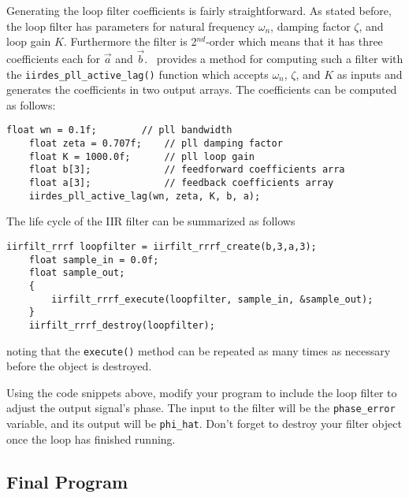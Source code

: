 Generating the loop filter coefficients is fairly straightforward.
As stated before, the loop filter has parameters for
natural frequency $\omega_n$,
damping factor $\zeta$, and
loop gain $K$.
Furthermore the filter is 2$^{nd}$-order which means that it has three
coefficients each for $\vec{a}$ and $\vec{b}$.
\liquid\ provides a method for computing such a filter with the
{\tt iirdes\_pll\_active\_lag()} function
which accepts $\omega_n$, $\zeta$, and $K$ as inputs and generates the
coefficients in two output arrays.
The coefficients can be computed as follows:
%
\begin{Verbatim}[fontsize=\small]
    float wn = 0.1f;        // pll bandwidth
    float zeta = 0.707f;    // pll damping factor
    float K = 1000.0f;      // pll loop gain
    float b[3];             // feedforward coefficients arra
    float a[3];             // feedback coefficients array
    iirdes_pll_active_lag(wn, zeta, K, b, a);
\end{Verbatim}
%
The life cycle of the IIR filter can be summarized as follows
%
\begin{Verbatim}[fontsize=\small]
    iirfilt_rrrf loopfilter = iirfilt_rrrf_create(b,3,a,3);
    float sample_in = 0.0f;
    float sample_out;
    {
        iirfilt_rrrf_execute(loopfilter, sample_in, &sample_out);
    }
    iirfilt_rrrf_destroy(loopfilter);
\end{Verbatim}
%
noting that the {\tt execute()} method can be repeated as many times as
necessary before the object is destroyed.

Using the code snippets above, modify your program to include the loop
filter to adjust the output signal's phase.
The input to the filter will be the {\tt phase\_error} variable, and its
output will be {\tt phi\_hat}.
Don't forget to destroy your filter object once the loop has finished
running.

\subsection{Final Program}
\label{tutorial:pll:completed}

